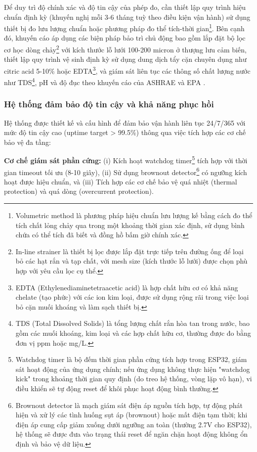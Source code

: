 \documentclass[../main.tex]{subfiles}
\begin{document}
Để duy trì độ chính xác và độ tin cậy của phép đo, cần thiết lập quy trình hiệu chuẩn định kỳ (khuyến nghị mỗi 3-6 tháng tuỳ theo điều kiện vận hành) sử dụng thiết bị đo lưu lượng chuẩn hoặc phương pháp đo thể tích-thời gian\footnote{Volumetric method là phương pháp hiệu chuẩn lưu lượng kế bằng cách đo thể tích chất lỏng chảy qua trong một khoảng thời gian xác định, sử dụng bình chứa có thể tích đã biết và đồng hồ bấm giờ chính xác.}. Bên cạnh đó, khuyến cáo áp dụng các biện pháp bảo trì chủ động bao gồm lắp đặt bộ lọc cơ học dòng chảy\footnote{In-line strainer là thiết bị lọc được lắp đặt trực tiếp trên đường ống để loại bỏ các hạt rắn và tạp chất, với mesh size (kích thước lỗ lưới) được chọn phù hợp với yêu cầu lọc cụ thể.} với kích thước lỗ lưới 100-200 micron ở thượng lưu cảm biến, thiết lập quy trình vệ sinh định kỳ sử dụng dung dịch tẩy cặn chuyên dụng như citric acid 5-10\% hoặc EDTA\footnote{EDTA (Ethylenediaminetetraacetic acid) là hợp chất hữu cơ có khả năng chelate (tạo phức) với các ion kim loại, được sử dụng rộng rãi trong việc loại bỏ cặn muối khoáng và làm sạch thiết bị.}, và giám sát liên tục các thông số chất lượng nước như TDS\footnote{TDS (Total Dissolved Solids) là tổng lượng chất rắn hòa tan trong nước, bao gồm các muối khoáng, kim loại và các hợp chất hữu cơ, thường được đo bằng đơn vị ppm hoặc mg/L.}, pH và độ đục theo khuyến cáo của ASHRAE và EPA \cite{datasheet_YFS201,ashrae2020cooling,epa_watersense_cooling_towers_2012}.

\subsubsection{Hệ thống đảm bảo độ tin cậy và khả năng phục hồi}
Hệ thống được thiết kế và cấu hình để đảm bảo vận hành liên tục 24/7/365 với mức độ tin cậy cao (uptime target > 99.5\%) thông qua việc tích hợp các cơ chế bảo vệ đa tầng:

\textbf{Cơ chế giám sát phần cứng:} (i) Kích hoạt watchdog timer\footnote{Watchdog timer là bộ đếm thời gian phần cứng tích hợp trong ESP32, giám sát hoạt động của ứng dụng chính; nếu ứng dụng không thực hiện "watchdog kick" trong khoảng thời gian quy định (do treo hệ thống, vòng lặp vô hạn), vi điều khiển sẽ tự động reset để khôi phục hoạt động bình thường.} tích hợp với thời gian timeout tối ưu (8-10 giây), (ii) Sử dụng brownout detector\footnote{Brownout detector là mạch giám sát điện áp nguồn tích hợp, tự động phát hiện và xử lý các tình huống sụt áp (brownout) hoặc mất điện tạm thời; khi điện áp cung cấp giảm xuống dưới ngưỡng an toàn (thường 2.7V cho ESP32), hệ thống sẽ được đưa vào trạng thái reset để ngăn chặn hoạt động không ổn định và bảo vệ dữ liệu.} có ngưỡng kích hoạt được hiệu chuẩn, và (iii) Tích hợp các cơ chế bảo vệ quá nhiệt (thermal protection) và quá dòng (overcurrent protection).
\end{document}
